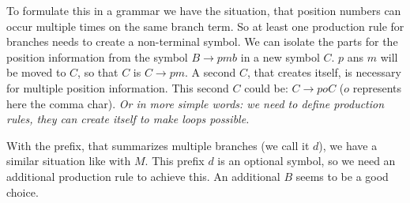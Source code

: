 \documentclass[a4paper,10pt]{article}
\begin{document}
To formulate this in a grammar we have the situation, that position numbers can occur multiple times on the same branch term. So at least one production rule for branches needs to create a non-terminal symbol. We can isolate the parts for the position information from the symbol $B \rightarrow pmb$ in a new symbol $C$. $p$ ans $m$ will be moved to $C$, so that $C$ is $C \rightarrow pm$. A second $C$, that creates itself, is necessary for multiple position information. This second $C$ could be: $C \rightarrow poC$ ($o$ represents here the comma char). \emph{Or in more simple words: we need to define production rules, they can create itself to make loops possible.}

With the prefix, that summarizes multiple branches (we call it $d$), we have a similar situation like with $M$. This prefix $d$ is an optional symbol, so we need an additional production rule to achieve this. An additional $B$ seems to be a good choice.
\end{document}
